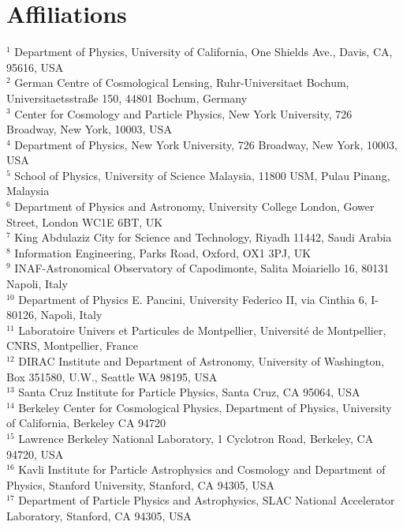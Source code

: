 \documentclass[\docopts]{\docclass}
\begin{document}
\section*{Affiliations}
$^{1}$ Department of Physics, University of California, One Shields Ave., Davis, CA, 95616, USA\\
$^{2}$ German Centre of Cosmological Lensing, Ruhr-Universitaet Bochum, Universitaetsstra{\ss}e 150, 44801 Bochum, Germany\\
$^{3}$ Center for Cosmology and Particle Physics, New York University, 726 Broadway, New York, 10003, USA\\
$^{4}$ Department of Physics, New York University, 726 Broadway, New York, 10003, USA\\
$^{5}$ School of Physics, University of Science Malaysia, 11800 USM, Pulau Pinang, Malaysia\\
$^{6}$ Department of Physics and Astronomy, University College London, Gower Street, London WC1E 6BT, UK\\
$^{7}$ King Abdulaziz City for Science and Technology, Riyadh 11442, Saudi Arabia\\
$^{8}$ Information Engineering, Parks Road, Oxford, OX1 3PJ, UK\\
$^{9}$ INAF-Astronomical Observatory of Capodimonte, Salita Moiariello 16, 80131 Napoli, Italy\\
$^{10}$ Department of Physics E. Pancini, University Federico II, via Cinthia 6, I-80126, Napoli, Italy\\
$^{11}$ Laboratoire Univers et Particules de Montpellier, Universit\'e de Montpellier, CNRS, Montpellier, France\\
$^{12}$ DIRAC Institute and Department of Astronomy, University of Washington, Box 351580, U.W., Seattle WA 98195, USA\\
$^{13}$ Santa Cruz Institute for Particle Physics, Santa Cruz, CA 95064, USA\\
$^{14}$ Berkeley Center for Cosmological Physics, Department of Physics, University of California, Berkeley CA 94720\\
$^{15}$ Lawrence Berkeley National Laboratory, 1 Cyclotron Road, Berkeley, CA 94720, USA\\
$^{16}$ Kavli Institute for Particle Astrophysics and Cosmology and Department of Physics, Stanford University, Stanford, CA 94305, USA\\
$^{17}$ Department of Particle Physics and Astrophysics, SLAC National Accelerator Laboratory, Stanford, CA 94305, USA\\
\end{document}
